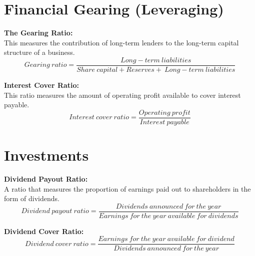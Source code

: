 \documentclass{report}
\newenvironment{blackbox}[1][Black]
  {\begin{tcolorbox}[colframe=#1,colback=white]}
  {\end{tcolorbox}}
\begin{document}
\section{Financial Gearing (Leveraging)}

\begin{blackbox}
    \textbf{The Gearing Ratio:}\\
    This measures the contribution of long-term lenders to the long-term capital structure of a business.
    \begin{equation}
        Gearing \: ratio = \frac{Long-term \: liabilities}{Share \: capital + Reserves + \: Long-term \: liabilities}
    \end{equation}
\end{blackbox}

\begin{blackbox}
    \textbf{Interest Cover Ratio:}\\
    This ratio measures the amount of operating profit available to cover interest payable.
    \begin{equation}
        Interest \: cover \: ratio = \frac{Operating \: profit}{Interest \: payable}
    \end{equation}
\end{blackbox}

\section{Investments}

\begin{blackbox}
    \textbf{Dividend Payout Ratio:}\\
    A ratio that measures the proportion of earnings paid out to shareholders in the form of dividends.
    \begin{equation}
        Dividend \: payout \: ratio = \frac{Dividends \: announced \: for \: the \: year}{Earnings \: for \: the \: year \: available \: for \: dividends}
    \end{equation}
\end{blackbox}

\begin{blackbox}
    \textbf{Dividend Cover Ratio:}
    \begin{equation}
        Dividend \: cover \: ratio = \frac{Earnings \: for \: the \: year \: available \: for \: dividend}{Dividends \: announced \: for \: the \: year}
    \end{equation}
\end{blackbox}
\end{document}

